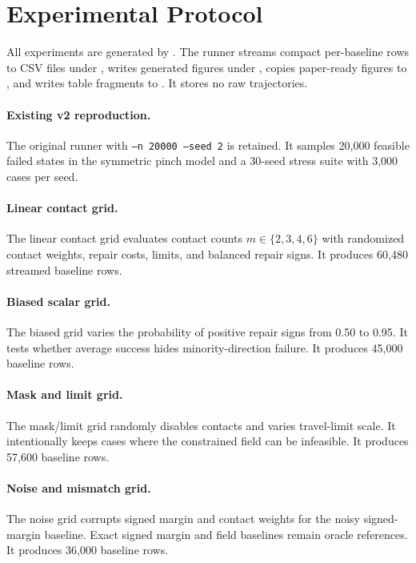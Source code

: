 \documentclass{article}
\begin{document}
\section{Experimental Protocol}

All experiments are generated by . The runner streams compact per-baseline rows to CSV files under , writes generated figures under , copies paper-ready figures to , and writes table fragments to . It stores no raw trajectories.

\paragraph{Existing v2 reproduction.}
The original runner  with \texttt{--n 20000 --seed 2} is retained. It samples 20,000 feasible failed states in the symmetric pinch model and a 30-seed stress suite with 3,000 cases per seed.

\paragraph{Linear contact grid.}
The linear contact grid evaluates contact counts $m\in\{2,3,4,6\}$ with randomized contact weights, repair costs, limits, and balanced repair signs. It produces 60,480 streamed baseline rows.

\paragraph{Biased scalar grid.}
The biased grid varies the probability of positive repair signs from 0.50 to 0.95. It tests whether average success hides minority-direction failure. It produces 45,000 baseline rows.

\paragraph{Mask and limit grid.}
The mask/limit grid randomly disables contacts and varies travel-limit scale. It intentionally keeps cases where the constrained field can be infeasible. It produces 57,600 baseline rows.

\paragraph{Noise and mismatch grid.}
The noise grid corrupts signed margin and contact weights for the noisy signed-margin baseline. Exact signed margin and field baselines remain oracle references. It produces 36,000 baseline rows.
\end{document}
